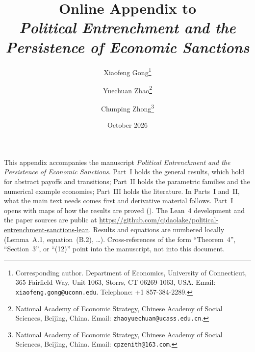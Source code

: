 \documentclass[11pt]{article}
\title{Online Appendix to\\
       \emph{Political Entrenchment and the Persistence of Economic Sanctions}}
\author{Xiaofeng Gong\thanks{Corresponding author. Department of
Economics, University of Connecticut, 365 Fairfield Way, Unit 1063,
Storrs, CT 06269-1063, USA. Email:
\texttt{xiaofeng.gong@uconn.edu}. Telephone: +1 857-384-2289.}
\and Yuechuan Zhao\thanks{National Academy of Economic Strategy, Chinese Academy of
Social Sciences, Beijing, China. Email: \texttt{zhaoyuechuan@ucass.edu.cn}.}
\and Chunping Zhong\thanks{National Academy of Economic Strategy, Chinese Academy of
Social Sciences, Beijing, China. Email: \texttt{cpzenith@163.com}.}}
\date{October 2026}
\numberwithin{equation}{section}
\numberwithin{theorem}{section}
\begin{document}
\maketitle

\noindent
This appendix accompanies the manuscript \emph{Political Entrenchment and the
Persistence of Economic Sanctions}. Part~I holds the general results, which hold for
abstract payoffs and transitions; Part~II holds the parametric families and the
numerical example economies; Part~III holds the literature. In Parts~I and~II, what
the main text needs comes first and derivative material follows. Part~I opens with maps
of how the results are proved (). The Lean~4 development and the
paper sources are public at \url{https://github.com/qidaolake/political-entrenchment-sanctions-lean}.  Results and equations are numbered locally (Lemma~A.1,
equation~(B.2), \dots).  Cross-references of the form ``Theorem~4'',
``Section~3'', or ``(12)'' point into the manuscript, not into this
document.

\medskip





\end{document}
